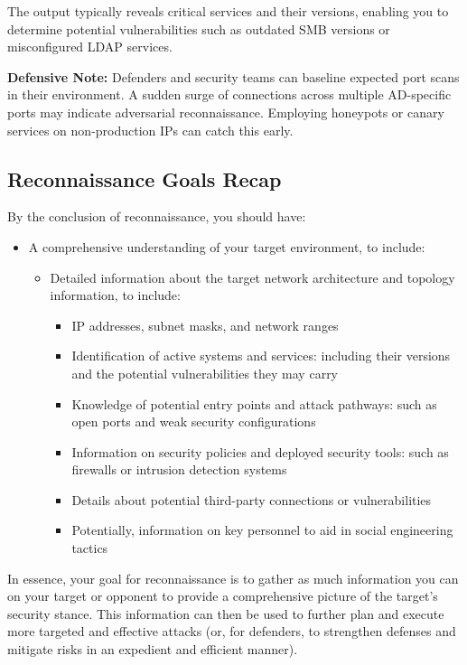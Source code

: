 The output typically reveals critical services and their versions, enabling you to determine potential vulnerabilities such as outdated SMB versions or misconfigured LDAP services.

\textbf{Defensive Note:}
Defenders and security teams can baseline expected port scans in their environment. A sudden surge of connections across multiple AD-specific ports may indicate adversarial reconnaissance. Employing honeypots or canary services on non-production IPs can catch this early.

\subsection{Reconnaissance Goals Recap}
By the conclusion of reconnaissance, you should have:
\begin{itemize}
    \item A comprehensive understanding of your target environment, to include:
    \begin{itemize}
        \item Detailed information about the target network architecture and topology information, to include:
        \begin{itemize}
            \item IP addresses, subnet masks, and network ranges
            \item Identification of active systems and services: including their versions and the potential vulnerabilities they may carry
            \item Knowledge of potential entry points and attack pathways: such as open ports and weak security configurations
            \item Information on security policies and deployed security tools: such as firewalls or intrusion detection systems
            \item Details about potential third-party connections or vulnerabilities
            \item Potentially, information on key personnel to aid in social engineering tactics
        \end{itemize}
    \end{itemize}
\end{itemize}

In essence, your goal for reconnaissance is to gather as much information you can on your target or opponent to provide a comprehensive picture of the target's security stance. This information can then be used to further plan and execute more targeted and effective attacks (or, for defenders, to strengthen defenses and mitigate risks in an expedient and efficient manner).